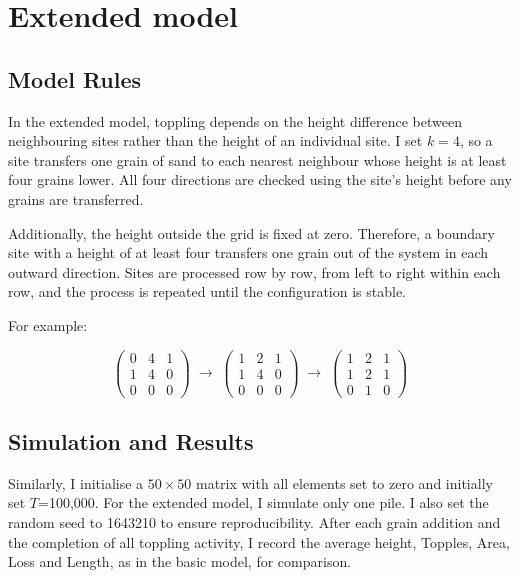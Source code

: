 \chapter{Extended model}\label{ch: extended_model}

\section{Model Rules}

In the extended model, toppling depends on the height difference between neighbouring sites rather than the height of an individual site. I set $k=4$, so a site transfers one grain of sand to each nearest neighbour whose height is at least four grains lower. All four directions are checked using the site's height before any grains are transferred.

Additionally, the height outside the grid is fixed at zero. Therefore, a boundary site with a height of at least four transfers one grain out of the system in each outward direction. Sites are processed row by row, from left to right within each row, and the process is repeated until the configuration is stable.

For example:

\[
\begin{pmatrix}
	0 & 4 & 1 \\
	1 & 4 & 0 \\
	0 & 0 & 0
\end{pmatrix}
\;\rightarrow\;
\begin{pmatrix}
	1 & 2 & 1 \\
	1 & 4 & 0 \\
	0 & 0 & 0
\end{pmatrix}
\;\rightarrow\;
\begin{pmatrix}
	1 & 2 & 1 \\
	1 & 2 & 1 \\
	0 & 1 & 0
\end{pmatrix}
\]

\section{Simulation and Results}
Similarly, I initialise a $50 \times 50$ matrix with all elements set to zero and initially set $T$=100,000. For the extended model, I simulate only one pile. I also set the random seed to 1643210 to ensure reproducibility. After each grain addition and the completion of all toppling activity, I record the average height, Topples, Area, Loss and Length, as in the basic model, for comparison. 

